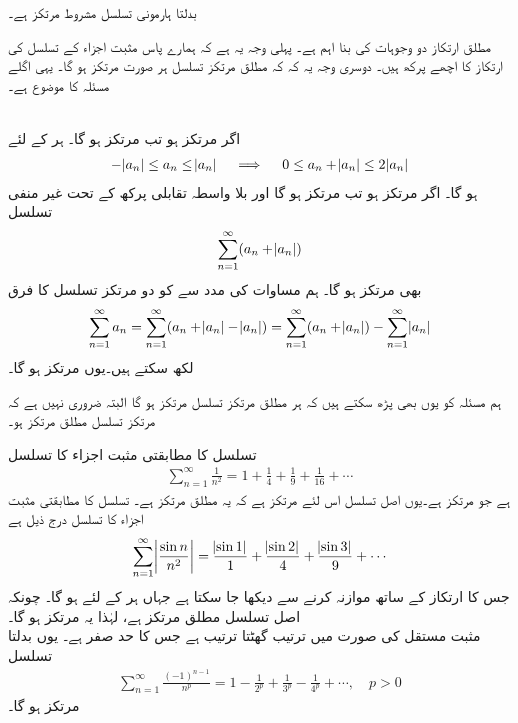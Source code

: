 بدلتا ہارمونی تسلسل مشروط مرتکز ہے۔

مطلق ارتکاز دو وجوہات کی بنا اہم ہے۔ پہلی وجہ یہ ہے کہ ہمارے پاس مثبت اجزاء کے تسلسل کی ارتکاز کا اچھے پرکھ ہیں۔ دوسری وجہ یہ کہ کہ مطلق مرتکز تسلسل ہر صورت مرتکز ہو گا۔ یہی اگلے مسئلہ کا موضوع ہے۔

\\
اگر  مرتکز ہو تب  مرتکز ہو گا۔
ہر  کے لئے
\begin{align*}
-\abs{a_n}\le a_n\le \abs{a_n}\quad \implies \quad 0\le a_n+\abs{a_n}\le 2\abs{a_n}
\end{align*}
ہو گا۔ اگر  مرتکز ہو تب  مرتکز ہو گا اور بلا واسطہ تقابلی پرکھ کے تحت  غیر منفی تسلسل 
\begin{align*}
\sum_{n=1}^{\infty}(a_n+\abs{a_n})
\end{align*}
بھی مرتکز ہو گا۔ ہم مساوات  کی مدد سے   کو دو مرتکز تسلسل کا فرق 
\begin{align*}
\sum_{n=1}^{\infty}a_n=\sum_{n=1}^{\infty}(a_n+\abs{a_n}-\abs{a_n})=\sum_{n=1}^{\infty}(a_n+\abs{a_n})-\sum_{n=1}^{\infty}\abs{a_n}
\end{align*}
لکھ سکتے ہیں۔یوں  مرتکز ہو گا۔

ہم مسئلہ  کو یوں بھی پڑھ سکتے ہیں کہ ہر مطلق مرتکز تسلسل مرتکز ہو گا البتہ ضروری نہیں ہے کہ مرتکز تسلسل مطلق مرتکز ہو۔

تسلسل  کا مطابقتی مثبت اجزاء کا تسلسل
\begin{align*}
\sum_{n=1}^{\infty}\frac{1}{n^2}=1+\frac{1}{4}+\frac{1}{9}+\frac{1}{16}+\cdots
\end{align*} 
ہے جو مرتکز ہے۔یوں اصل تسلسل اس لئے مرتکز ہے کہ یہ مطلق مرتکز ہے۔
تسلسل  کا مطابقتی مثبت اجزاء کا تسلسل درج ذیل ہے
\begin{align*}
\sum_{n=1}^{\infty}\abs{\frac{\sin n}{n^2}}=\frac{\abs{\sin 1}}{1}+\frac{\abs{\sin 2}}{4}+\frac{\abs{\sin 3}}{9}+\cdots
\end{align*}
جس کا ارتکاز   کے ساتھ موازنہ کرنے سے دیکھا جا سکتا ہے جہاں ہر  کے لئے  ہو گا۔ چونکہ اصل تسلسل مطلق مرتکز ہے، لہٰذا یہ مرتکز ہو گا۔
\\
مثبت مستقل  کی صورت میں ترتیب   گھٹتا ترتیب ہے جس کا حد صفر ہے۔ یوں بدلتا  تسلسل
\begin{align*}
\sum_{n=1}^{\infty}\frac{(-1)^{n-1}}{n^p}=1-\frac{1}{2^p}+\frac{1}{3^p}-\frac{1}{4^p}+\cdots,\quad p>0
\end{align*}
مرتکز ہو گا۔

